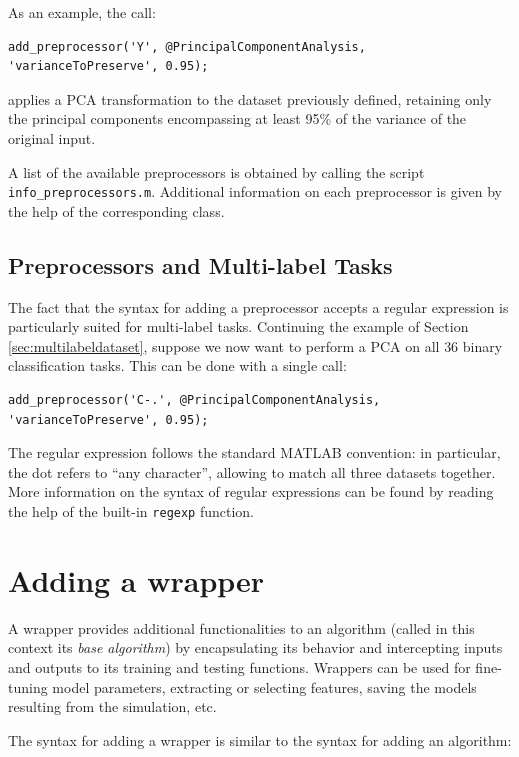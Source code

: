 \noindent As an example, the call:

\begin{lstlisting}
add_preprocessor('Y', @PrincipalComponentAnalysis, 'varianceToPreserve', 0.95);
\end{lstlisting}

\noindent applies a PCA transformation to the dataset previously defined, retaining only the principal components encompassing at least 95\% of the variance of the original input.

A list of the available preprocessors is obtained by calling the script \verb|info_preprocessors.m|. Additional information on each preprocessor is given by the help of the corresponding class.

\subsection{Preprocessors and Multi-label Tasks}

The fact that the syntax for adding a preprocessor accepts a regular expression is particularly suited for multi-label tasks. Continuing the example of Section \ref{sec:multilabeldataset}, suppose we now want to perform a PCA on all $36$ binary classification tasks. This can be done with a single call:

\begin{lstlisting}
add_preprocessor('C-.', @PrincipalComponentAnalysis, 'varianceToPreserve', 0.95);
\end{lstlisting}

\noindent The regular expression follows the standard MATLAB convention: in particular, the dot refers to ``any character'', allowing to match all three datasets together. More information on the syntax of regular expressions can be found by reading the help of the built-in \verb|regexp| function.

\section{Adding a wrapper}

A wrapper provides additional functionalities to an algorithm (called in this context its \textit{base algorithm}) by encapsulating its behavior and intercepting inputs and outputs to its training and testing functions. Wrappers can be used for fine-tuning model parameters, extracting or selecting features, saving the models resulting from the simulation, etc.

The syntax for adding a wrapper is similar to the syntax for adding an algorithm:

